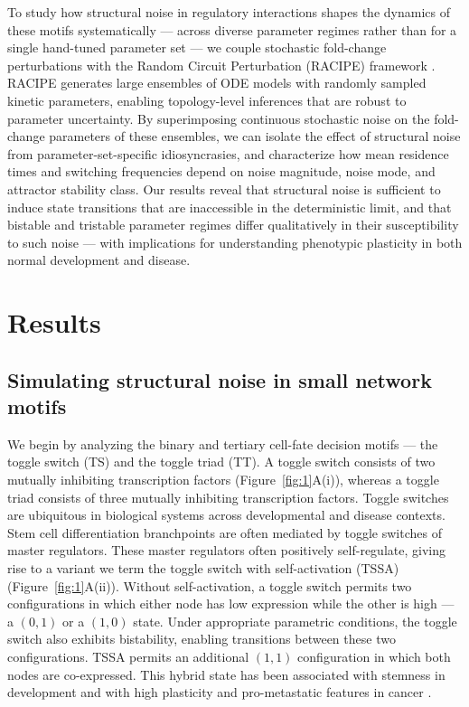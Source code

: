 \documentclass[11pt]{article}
\begin{document}
To study how structural noise in regulatory interactions shapes the dynamics of these motifs systematically — across diverse parameter regimes rather than for a single hand-tuned parameter set — we couple stochastic fold-change perturbations with the Random Circuit Perturbation (RACIPE) framework \cite{Huang2017}. RACIPE generates large ensembles of ODE models with randomly sampled kinetic parameters, enabling topology-level inferences that are robust to parameter uncertainty. By superimposing continuous stochastic noise on the fold-change parameters of these ensembles, we can isolate the effect of structural noise from parameter-set-specific idiosyncrasies, and characterize how mean residence times and switching frequencies depend on noise magnitude, noise mode, and attractor stability class. Our results reveal that structural noise is sufficient to induce state transitions that are inaccessible in the deterministic limit, and that bistable and tristable parameter regimes differ qualitatively in their susceptibility to such noise — with implications for understanding phenotypic plasticity in both normal development and disease.

\section{Results}

\subsection{Simulating structural noise in small network motifs}

We begin by analyzing the binary and tertiary cell-fate decision motifs --- the toggle switch (TS) and the toggle triad (TT). A toggle switch consists of two mutually inhibiting transcription factors (Figure~\ref{fig:1}A(i)), whereas a toggle triad consists of three mutually inhibiting transcription factors. Toggle switches are ubiquitous in biological systems across developmental and disease contexts. Stem cell differentiation branchpoints are often mediated by toggle switches of master regulators. These master regulators often positively self-regulate, giving rise to a variant we term the toggle switch with self-activation (TSSA) (Figure~\ref{fig:1}A(ii)). Without self-activation, a toggle switch permits two configurations in which either node has low expression while the other is high --- a $(0,1)$ or a $(1,0)$ state. Under appropriate parametric conditions, the toggle switch also exhibits bistability, enabling transitions between these two configurations. TSSA permits an additional $(1,1)$ configuration in which both nodes are co-expressed. This hybrid state has been associated with stemness in development and with high plasticity and pro-metastatic features in cancer \cite{Pastushenko2019EMTMetastasis}.
\end{document}
